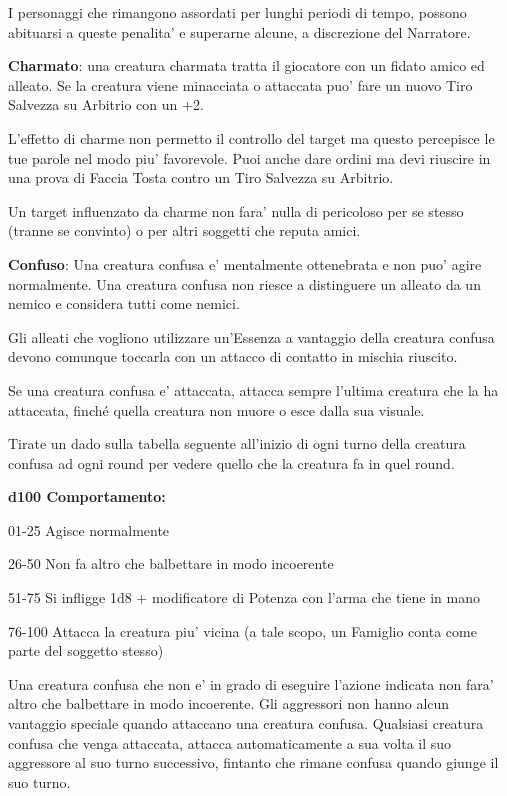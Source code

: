 \documentclass[a4paper,11pt,twoside,openany]{book}
\begin{document}
{		I personaggi che rimangono assordati per lunghi periodi di tempo, possono abituarsi a queste penalita' e superarne alcune, a discrezione del Narratore.
		
		\textbf{Charmato}: una creatura charmata tratta il giocatore con un fidato amico ed alleato. Se la creatura viene minacciata o attaccata puo' fare un nuovo Tiro Salvezza su Arbitrio con un +2.
		
		L'effetto di charme non permetto il controllo del target ma questo percepisce le tue parole nel modo piu' favorevole. Puoi anche dare ordini ma devi riuscire in una prova di Faccia Tosta contro un Tiro Salvezza su Arbitrio.
		
		Un target influenzato da charme non fara' nulla di pericoloso per se stesso (tranne se convinto) o per altri soggetti che reputa amici.
		
		\textbf{Confuso}: Una creatura confusa e' mentalmente ottenebrata e non puo' agire normalmente. Una creatura confusa non riesce a distinguere un alleato da un nemico e considera tutti come nemici.
		
		Gli alleati che vogliono utilizzare un'Essenza a vantaggio della creatura confusa devono comunque toccarla con un attacco di contatto in mischia riuscito.
		
		Se una creatura confusa e' attaccata, attacca sempre l'ultima creatura che la ha attaccata, finché quella creatura non muore o esce dalla sua visuale.
		
		Tirate un dado sulla tabella seguente all'inizio di ogni turno della
		creatura confusa ad ogni round per vedere quello che la creatura fa
		in quel round.
		
		\textbf{d100 Comportamento:}
		
		01-25 Agisce normalmente
		
		26-50 Non fa altro che balbettare in modo incoerente
		
		51-75 Si infligge 1d8 + modificatore di Potenza con l'arma che tiene in mano
		
		76-100 Attacca la creatura piu' vicina (a tale scopo, un Famiglio conta come parte del soggetto stesso)
		
		Una creatura confusa che non e' in grado di eseguire l'azione indicata non fara' altro che balbettare in modo incoerente. Gli aggressori non hanno alcun vantaggio speciale quando attaccano una creatura confusa. Qualsiasi creatura confusa che venga attaccata, attacca automaticamente a sua volta il suo aggressore al suo turno successivo, fintanto che rimane confusa quando giunge il suo turno.
		
}
\end{document}
